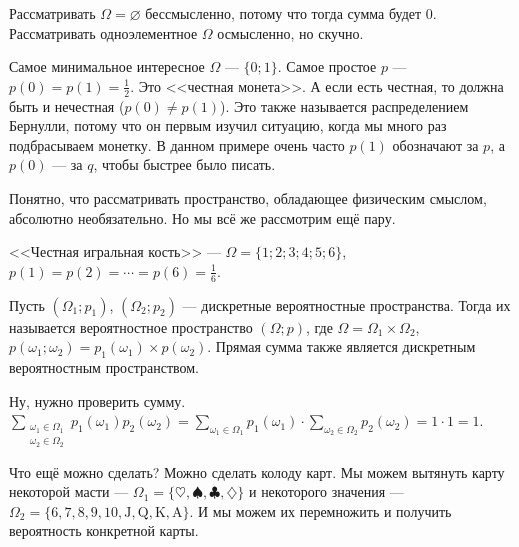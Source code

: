 \documentclass{article}
\begin{document}
\begin{itemize}
\begin{Comment}
        \end{Comment}
        \begin{Example}
            Рассматривать $\Omega=\varnothing$ бессмысленно, потому что тогда сумма будет 0. Рассматривать одноэлементное $\Omega$ осмысленно, но скучно.
        \end{Example}
        \begin{Example}
            Самое минимальное интересное $\Omega$ --- $\{0;1\}$. Самое простое $p$ --- $p(0)=p(1)=\frac12$. Это <<честная монета>>. А если есть честная, то должна быть и нечестная ($p(0)\neq p(1)$). Это также называется распределением Бернулли, потому что он первым изучил ситуацию, когда мы много раз подбрасываем монетку. В данном примере очень часто $p(1)$ обозначают за $p$, а $p(0)$ --- за $q$, чтобы быстрее было писать.
        \end{Example}
        \begin{Comment}
            Понятно, что рассматривать пространство, обладающее физическим смыслом, абсолютно необязательно. Но мы всё же рассмотрим ещё пару.
        \end{Comment}
        \begin{Example}
            <<Честная игральная кость>> --- $\Omega=\{1;2;3;4;5;6\}$, $p(1)=p(2)=\cdots=p(6)=\frac16$.
        \end{Example}
        \dfn Пусть $(\Omega_1;p_1)$, $(\Omega_2;p_2)$ --- дискретные вероятностные пространства. Тогда их  называется вероятностное пространство $(\Omega;p)$, где $\Omega=\Omega_1\times\Omega_2$, $p(\omega_1;\omega_2)=p_1(\omega_1)\times p(\omega_2)$.
        \thm Прямая сумма также является дискретным вероятностным пространством.
        \begin{Proof}
            Ну, нужно проверить сумму. $\sum\limits_{\substack{\omega_1\in\Omega_1\\\omega_2\in\Omega_2}}p_1(\omega_1)p_2(\omega_2)=\sum\limits_{\omega_1\in\Omega_1}p_1(\omega_1)\cdot\sum\limits_{\omega_2\in\Omega_2}p_2(\omega_2)=1\cdot1=1$.
        \end{Proof}
        \begin{Example}
            Что ещё можно сделать? Можно сделать колоду карт. Мы можем вытянуть карту некоторой масти --- $\Omega_1=\{\heartsuit,\spadesuit,\clubsuit,\diamondsuit\}$ и некоторого значения --- $\Omega_2=\{6,7,8,9,10,\mathrm J,\mathrm Q,\mathrm K,\mathrm A\}$. И мы можем их перемножить и получить вероятность конкретной карты.
        \end{Example}

\end{itemize}
\end{document}
